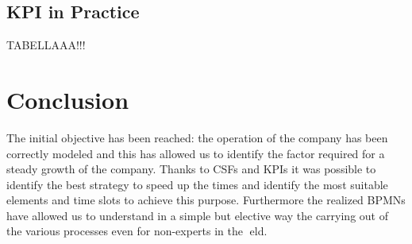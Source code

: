 \documentclass[a4paper,12pt]{report}
\begin{document}
\section{KPI in Practice}
TABELLAAA!!!
\chapter{Conclusion}
The initial objective has been reached: the operation of the company has been correctly modeled
and this has allowed us to identify the factor required for a steady growth of the company. Thanks
to CSFs and KPIs it was possible to identify the best strategy to speed up the times and identify the
most suitable elements and time slots to achieve this purpose. Furthermore the realized BPMNs have
allowed us to understand in a simple but elective way the carrying out of the various processes even
for non-experts in the eld.
\end{document}
